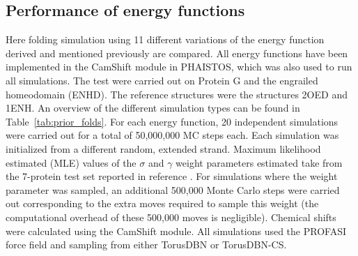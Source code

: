 \subsection{Performance of energy functions}

Here folding simulation using 11 different variations of the energy function derived and mentioned previously are compared.
All energy functions have been implemented in the CamShift module in PHAISTOS, which was also used to run all simulations.
The test were carried out on Protein G and the engrailed homeodomain (ENHD). The reference structures were the structures 2OED and 1ENH.
An overview of the different simulation types can be found in Table~\ref{tab:prior_folds}.
For each energy function, 20 independent simulations were carried out for a total of 50,000,000 MC steps each.
Each simulation was initialized from a different random, extended strand.
Maximum likelihood estimated (MLE) values of the $\sigma$ and $\gamma$ weight parameters estimated take from the 7-protein test set reported in reference \cite{CamShift}.
For simulations where the weight parameter was sampled, an additional 500,000 Monte Carlo steps were carried out corresponding to the extra moves required to sample this weight (the computational overhead of these 500,000 moves is negligible).
Chemical shifts were calculated using the CamShift module.
All simulations used the PROFASI force field and sampling from either TorusDBN or TorusDBN-CS.
